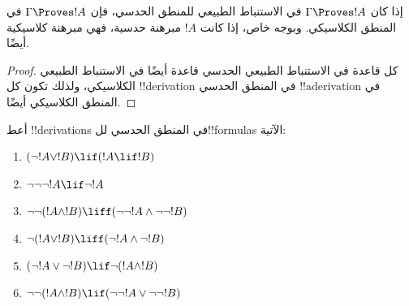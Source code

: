\documentclass[../../../include/open-logic-section]{subfiles}
\begin{document}
\begin{prop}
  إذا كان $\Gamma \Proves !A$ في الاستنباط الطبيعي للمنطق الحدسي،
  فإن $\Gamma \Proves !A$ في المنطق الكلاسيكي. وبوجه خاص، إذا كانت
  $!A$ مبرهنة حدسية، فهي مبرهنة كلاسيكية أيضًا.
\end{prop}

\begin{proof}
  كل قاعدة في الاستنباط الطبيعي الحدسي قاعدة أيضًا في الاستنباط
  الطبيعي الكلاسيكي، ولذلك تكون كل !!{derivation} في المنطق الحدسي
  !!a{derivation} في المنطق الكلاسيكي أيضًا.
\end{proof}

\begin{prob}
  أعط !!{derivation}s في المنطق الحدسي لل!!{formula}s الآتية:
  \begin{enumerate}
    \item $(\lnot !A \lor !B) \lif (!A \lif !B)$
    \item $\lnot\lnot\lnot !A \lif \lnot !A$
    \item $\lnot\lnot (!A \land !B) \liff (\lnot\lnot !A\land \lnot \lnot !B)$
    \item $\lnot (!A \lor !B) \liff (\lnot !A \land \lnot !B)$
    \item $(\lnot !A \lor \lnot !B) \lif \lnot (!A \land !B)$
    \item $\lnot\lnot ( !A \land !B) \lif  (\lnot\lnot !A \lor
    \lnot\lnot !B)$
  \end{enumerate}
\end{prob}
\end{document}
